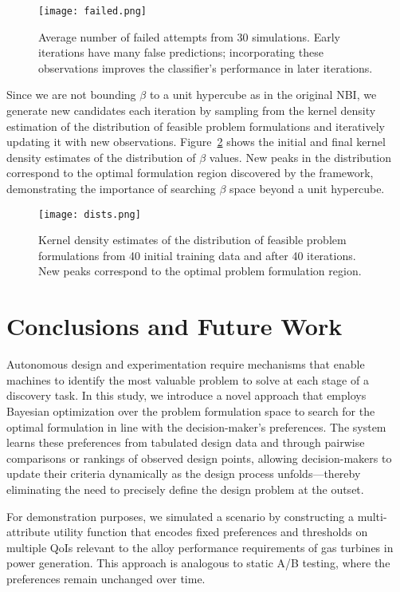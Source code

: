 \documentclass[final,5p,times,twocolumn]{elsarticle}
\begin{document}
\begin{figure}[htb!]
\centering
\texttt{[image: failed.png]}
\caption{Average number of failed attempts from 30 simulations. Early iterations have many false predictions; incorporating these observations improves the classifier's performance in later iterations.}
\label{fails}
\end{figure}

Since we are not bounding $\beta$ to a unit hypercube as in the original NBI, we generate new candidates each iteration by sampling from the kernel density estimation of the distribution of feasible problem formulations and iteratively updating it with new observations. Figure~\ref{dists} shows the initial and final kernel density estimates of the distribution of $\beta$ values. New peaks in the distribution correspond to the optimal formulation region discovered by the framework, demonstrating the importance of searching $\beta$ space beyond a unit hypercube.

\begin{figure}[htb!]
\centering
\texttt{[image: dists.png]}
\caption{Kernel density estimates of the distribution of feasible problem formulations from 40 initial training data and after 40 iterations. New peaks correspond to the optimal problem formulation region.}
\label{dists}
\end{figure}

\section{Conclusions and Future Work}
\label{conclusions}

Autonomous design and experimentation require mechanisms that enable machines to identify the most valuable problem to solve at each stage of a discovery task. In this study, we introduce a novel approach that employs Bayesian optimization over the problem formulation space to search for the optimal formulation in line with the decision-maker’s preferences. The system learns these preferences from tabulated design data and through pairwise comparisons or rankings of observed design points, allowing decision-makers to update their criteria dynamically as the design process unfolds—thereby eliminating the need to precisely define the design problem at the outset.

For demonstration purposes, we simulated a scenario by constructing a multi-attribute utility function that encodes fixed preferences and thresholds on multiple QoIs relevant to the alloy performance requirements of gas turbines in power generation. This approach is analogous to static A/B testing, where the preferences remain unchanged over time.
\end{document}
